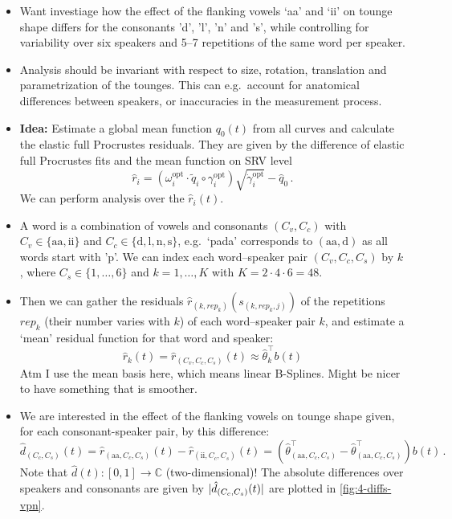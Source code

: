 \begin{itemize}
  \item Want investiage how the effect of the flanking vowels \enquote*{aa} and \enquote*{ii} on tounge shape differs for the consonants 'd', 'l', 'n' and 's', while controlling for variability over six speakers and 5--7 repetitions of the same word per speaker.
  \item Analysis should be invariant with respect to size, rotation, translation and parametrization of the tounges.
    This can e.g.\ account for anatomical differences between speakers, or inaccuracies in the measurement process.
  \item \textbf{Idea:} Estimate a global mean function $q_0(t)$ from all curves and calculate the elastic full Procrustes residuals.
    They are given by the difference of elastic full Procrustes fits and the mean function on SRV level
    $$ \hat r_i = \left( \omega_i^\mathrm{opt} \cdot \widetilde q_i \circ \gamma_i^\mathrm{opt} \right) \sqrt{\dot\gamma_i^\mathrm{opt}} - \hat q_0 \,.$$
    We can perform analysis over the $\hat r_i(t)$. 
  \item A word is a combination of vowels and consonants $(C_v, C_c)$ with $C_v \in \{\mathrm{aa}, \mathrm{ii}\}$ and $C_c \in \{\mathrm{d},\mathrm{l},\mathrm{n},\mathrm{s}\}$, e.g.\ \enquote*{pada} corresponds to $(\mathrm{aa},\mathrm{d})$ as all words start with 'p'.
    We can index each word--speaker pair $\left( C_v, C_c, C_s \right)$ by $k$, where $C_s \in \{1,\dots,6\}$ and $k = 1, \dots, K$ with $K = 2 \cdot 4 \cdot 6 = 48$.
  \item Then we can gather the residuals $\hat r_{(k, rep_k)}(s_{(k,rep_k,j)})$ of the repetitions $rep_k$ (their number varies with $k$) of each word--speaker pair $k$, and estimate a \enquote*{mean} residual function for that word and speaker:
    $$ \hat r_k (t) = \hat r_{\left( C_v, C_c, C_s \right)} (t) \approx \hat \theta_k^\top b(t)$$
    Atm I use the mean basis here, which means linear B-Splines. Might be nicer to have something that is smoother.
  \item We are interested in the effect of the flanking vowels on tounge shape given, for each consonant-speaker pair, by this difference:
    $$ \hat d_{(C_c, C_s)}(t) = \hat r_{(\mathrm{aa}, C_c, C_s)} (t) - \hat r_{(\mathrm{ii}, C_c, C_s)} (t) = 
      \left( \hat\theta^\top_{(\mathrm{aa}, C_c, C_s)} - \hat\theta^\top_{(\mathrm{aa}, C_c, C_s)} \right) b(t)\,. $$
    Note that $\hat d(t) : [0,1] \rightarrow \mathbb{C}$ (two-dimensional)! The absolute differences over speakers and consonants are given by $\lvert\hat d_{(C_c, C_s)}(t)\rvert$ are plotted in \cref{fig:4-diffs-vpn}.
\end{itemize}

